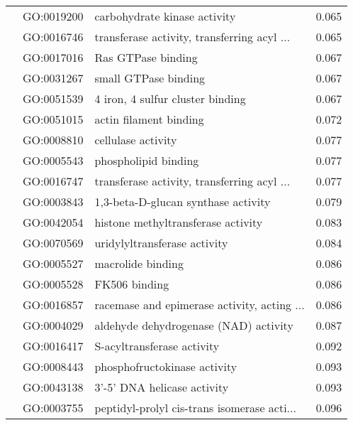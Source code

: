 \begin{longtable}{lllr}
   & GO:0019200 &                 carbohydrate kinase activity &         0.065 \\
   & GO:0016746 &  transferase activity, transferring acyl ... &         0.065 \\
   & GO:0017016 &                           Ras GTPase binding &         0.067 \\
   & GO:0031267 &                         small GTPase binding &         0.067 \\
   & GO:0051539 &             4 iron, 4 sulfur cluster binding &         0.067 \\
   & GO:0051015 &                       actin filament binding &         0.072 \\
   & GO:0008810 &                           cellulase activity &         0.077 \\
   & GO:0005543 &                         phospholipid binding &         0.077 \\
   & GO:0016747 &  transferase activity, transferring acyl ... &         0.077 \\
   & GO:0003843 &          1,3-beta-D-glucan synthase activity &         0.079 \\
   & GO:0042054 &           histone methyltransferase activity &         0.083 \\
   & GO:0070569 &                 uridylyltransferase activity &         0.084 \\
   & GO:0005527 &                            macrolide binding &         0.086 \\
   & GO:0005528 &                                FK506 binding &         0.086 \\
   & GO:0016857 &  racemase and epimerase activity, acting ... &         0.086 \\
   & GO:0004029 &        aldehyde dehydrogenase (NAD) activity &         0.087 \\
   & GO:0016417 &                   S-acyltransferase activity &         0.092 \\
   & GO:0008443 &                 phosphofructokinase activity &         0.093 \\
   & GO:0043138 &                  3'-5' DNA helicase activity &         0.093 \\
   & GO:0003755 &  peptidyl-prolyl cis-trans isomerase acti... &         0.096 \\
\end{longtable}
